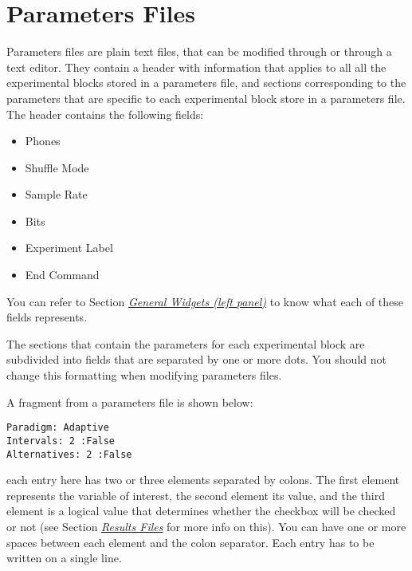 \documentclass[a4paper,12pt,english]{sphinxmanual}
\begin{document}
\section{Parameters Files}
\label{engine:sec-parameters-files}\label{engine:parameters-files}
Parameters files are plain text files, that can be modified through  or through a text editor. They contain a header with information that applies to all all the experimental blocks stored in a parameters file, and sections corresponding to the parameters that are specific to each experimental block store in a parameters file. The header contains the following
fields:
\begin{itemize}
\item {} 
Phones

\item {} 
Shuffle Mode

\item {} 
Sample Rate

\item {} 
Bits

\item {} 
Experiment Label

\item {} 
End Command

\end{itemize}

You can refer to Section {\hyperref[graphical_user_interface:sec-gui-left-panel]{\emph{General Widgets (left panel)}}} to know what each of these fields represents.

The sections that contain the parameters for each experimental block are
subdivided into fields that are separated by one or more dots. You
should not change this formatting when modifying parameters files.

A fragment from a parameters file is shown below:

\begin{Verbatim}[commandchars=\\\{\}]
Paradigm: Adaptive
Intervals: 2 :False
Alternatives: 2 :False
\end{Verbatim}

each entry here has two or three elements separated by colons. The first
element represents the variable of interest, the second element its
value, and the third element is a logical value that determines whether
the  checkbox will be checked or not (see Section {\hyperref[engine:sec-results-files]{\emph{Results Files}}} for more info on this).
You can have one or more spaces between each element and the colon
separator. Each entry has to be written on a single line.
\end{document}

